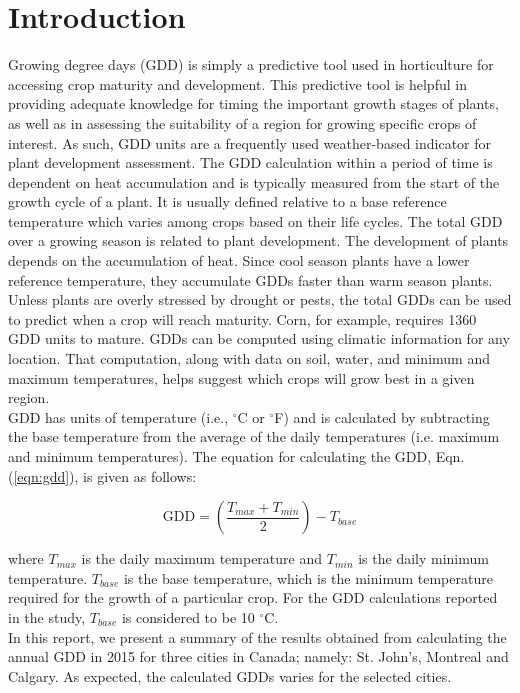 \documentclass{article}
\begin{document}

\section{ \bf Introduction}
Growing degree days (GDD) is simply a predictive tool used in horticulture for accessing crop maturity and development. This predictive tool is helpful in providing adequate knowledge for timing the important growth stages of plants, as well as in assessing the suitability of a region for growing specific crops of interest. As such, GDD units are a frequently used weather-based indicator for plant development assessment. The GDD calculation within a period of time is dependent on heat accumulation and is typically measured from the start of the growth cycle of a plant. It is usually defined relative to a base reference temperature which varies among crops based on their life cycles. The total GDD over a growing season is related to plant development. The development of plants depends on the accumulation of heat. Since cool season plants have a lower reference temperature, they accumulate GDDs faster than warm season plants. Unless plants are overly stressed by drought or pests, the total GDDs can be used to predict when a crop will reach maturity. Corn, for example, requires 1360 GDD units to mature. GDDs can be computed using climatic information for any location. That computation, along with data on soil, water, and minimum and maximum temperatures, helps suggest which crops will grow best in a given region.\\ [\baselineskip] GDD has units of temperature (i.e., $^{\circ}$C or $^{\circ}$F) and is calculated by subtracting the base temperature from the average of the daily temperatures (i.e. maximum and minimum temperatures). The equation for calculating the GDD, Eqn.(\ref{eqn:gdd}), is given as follows:

\begin{equation}
\textrm{GDD} = \left(\frac{T_{max} + T_{min}}{2}\right) - T_{base}
\label{eqn:gdd}
\end{equation}

\noindent where {$T_{max}$} is the daily maximum temperature and {$T_{min}$} is the daily minimum temperature. {$T_{base}$} is the base temperature, which is the minimum temperature required for the growth of a particular crop. For the GDD calculations reported in the study, {$T_{base}$} is considered to be 10 $^{\circ}$C.\\
In this report, we present a summary of the results obtained from calculating the annual GDD in 2015 for three cities in Canada; namely: St. John's, Montreal and Calgary. As expected, the calculated GDDs varies for the selected cities. 
\end{document}
